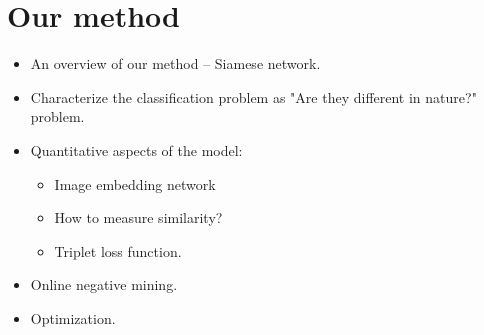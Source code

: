 \section{Our method}

{
\color{gray} 
\begin{itemize}

    \item An overview of our method -- Siamese network.  

    \item Characterize the classification problem as "Are they different in
    nature?" problem.  

    \item Quantitative aspects of the model:

    \begin{itemize}

        \item Image embedding network
        \item How to measure similarity?
        \item Triplet loss function.  

    \end{itemize}
    
    \item Online negative mining. 

    \item Optimization.  

\end{itemize}
}

